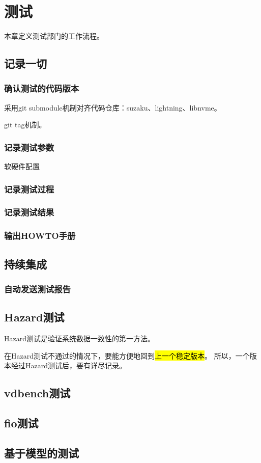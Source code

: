 \chapter{测试}

本章定义测试部门的工作流程。

\section{记录一切}

\subsection{确认测试的代码版本}

采用git submodule机制对齐代码仓库：suzaku、lightning、libnvme。

git tag机制。

\subsection{记录测试参数}

软硬件配置

\subsection{记录测试过程}

\subsection{记录测试结果}

\subsection{输出HOWTO手册}

\section{持续集成}

\subsection{自动发送测试报告}

\section{Hazard测试}

Hazard测试是验证系统数据一致性的第一方法。

在Hazard测试不通过的情况下，要能方便地回到\hl{上一个稳定版本}。
所以，一个版本经过Hazard测试后，要有详尽记录。

\section{vdbench测试}

\section{fio测试}

\section{基于模型的测试}
